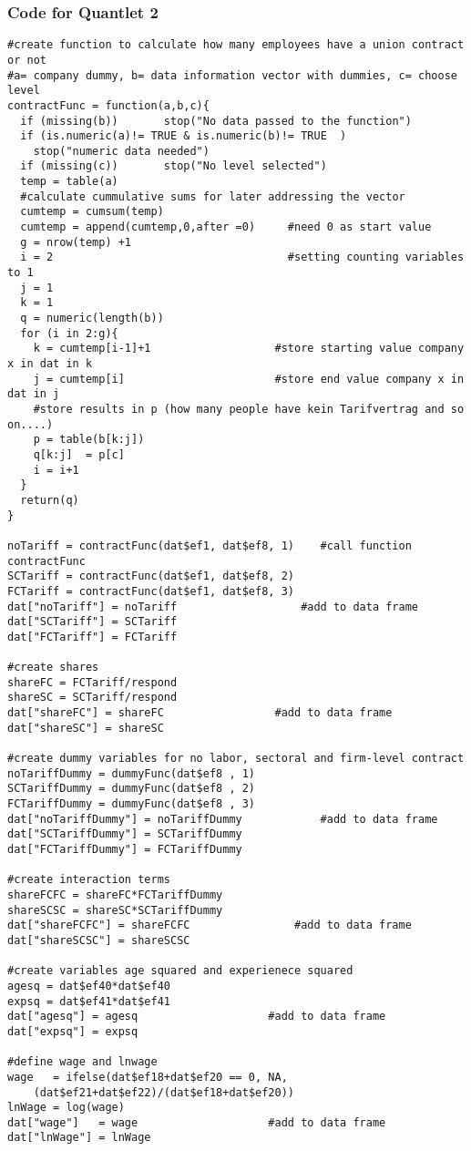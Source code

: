 \subsubsection{Code for Quantlet 2}
\lstset{firstnumber = 89}
\begin{lstlisting}
#create function to calculate how many employees have a union contract or not
#a= company dummy, b= data information vector with dummies, c= choose level
contractFunc = function(a,b,c){            
  if (missing(b)) 		stop("No data passed to the function")
  if (is.numeric(a)!= TRUE & is.numeric(b)!= TRUE  )
    stop("numeric data needed")
  if (missing(c))		stop("No level selected")
  temp = table(a)
  #calculate cummulative sums for later addressing the vector
  cumtemp = cumsum(temp)                 
  cumtemp = append(cumtemp,0,after =0)     #need 0 as start value 
  g = nrow(temp) +1
  i = 2                                    #setting counting variables to 1
  j = 1
  k = 1
  q = numeric(length(b))
  for (i in 2:g){
    k = cumtemp[i-1]+1                   #store starting value company x in dat in k
    j = cumtemp[i]                       #store end value company x in dat in j
    #store results in p (how many people have kein Tarifvertrag and so on....)
    p = table(b[k:j])                      
    q[k:j]  = p[c]                   
    i = i+1
  }
  return(q)
}

noTariff = contractFunc(dat$ef1, dat$ef8, 1) 	#call function contractFunc
SCTariff = contractFunc(dat$ef1, dat$ef8, 2)
FCTariff = contractFunc(dat$ef1, dat$ef8, 3)
dat["noTariff"] = noTariff               	 #add to data frame
dat["SCTariff"] = SCTariff
dat["FCTariff"] = FCTariff

#create shares
shareFC = FCTariff/respond
shareSC = SCTariff/respond
dat["shareFC"] = shareFC           		 #add to data frame
dat["shareSC"] = shareSC

#create dummy variables for no labor, sectoral and firm-level contract
noTariffDummy = dummyFunc(dat$ef8 , 1)
SCTariffDummy = dummyFunc(dat$ef8 , 2)
FCTariffDummy = dummyFunc(dat$ef8 , 3)
dat["noTariffDummy"] = noTariffDummy          	#add to data frame
dat["SCTariffDummy"] = SCTariffDummy
dat["FCTariffDummy"] = FCTariffDummy

#create interaction terms
shareFCFC = shareFC*FCTariffDummy
shareSCSC = shareSC*SCTariffDummy
dat["shareFCFC"] = shareFCFC          		#add to data frame
dat["shareSCSC"] = shareSCSC

#create variables age squared and experienece squared 
agesq = dat$ef40*dat$ef40
expsq = dat$ef41*dat$ef41
dat["agesq"] = agesq         			#add to data frame
dat["expsq"] = expsq

#define wage and lnwage
wage   = ifelse(dat$ef18+dat$ef20 == 0, NA, 
	(dat$ef21+dat$ef22)/(dat$ef18+dat$ef20))
lnWage = log(wage)
dat["wage"]   = wage              		#add to data frame
dat["lnWage"] = lnWage
\end{lstlisting}


